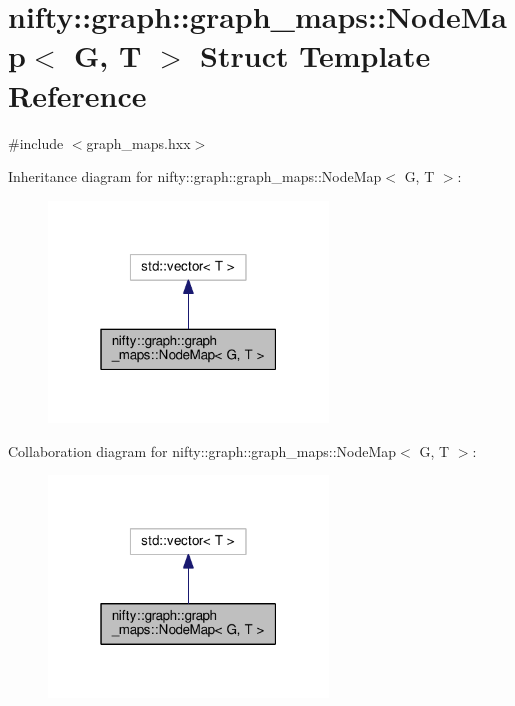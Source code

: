 \hypertarget{structnifty_1_1graph_1_1graph__maps_1_1NodeMap}{}\section{nifty\+:\+:graph\+:\+:graph\+\_\+maps\+:\+:Node\+Map$<$ G, T $>$ Struct Template Reference}
\label{structnifty_1_1graph_1_1graph__maps_1_1NodeMap}


{\ttfamily \#include $<$graph\+\_\+maps.\+hxx$>$}



Inheritance diagram for nifty\+:\+:graph\+:\+:graph\+\_\+maps\+:\+:Node\+Map$<$ G, T $>$\+:\nopagebreak
\begin{figure}[H]
\begin{center}
\leavevmode
\includegraphics[width=211pt]{structnifty_1_1graph_1_1graph__maps_1_1NodeMap__inherit__graph}
\end{center}
\end{figure}


Collaboration diagram for nifty\+:\+:graph\+:\+:graph\+\_\+maps\+:\+:Node\+Map$<$ G, T $>$\+:\nopagebreak
\begin{figure}[H]
\begin{center}
\leavevmode
\includegraphics[width=211pt]{structnifty_1_1graph_1_1graph__maps_1_1NodeMap__coll__graph}
\end{center}
\end{figure}
